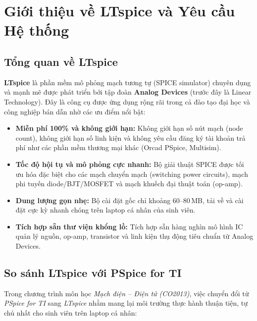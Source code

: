 \documentclass[11pt,a4paper]{article}
\begin{document}
\newpage
\tableofcontents
\newpage


\section{Giới thiệu về LTspice và Yêu cầu Hệ thống}

\subsection{Tổng quan về LTspice}
\textbf{LTspice} là phần mềm mô phỏng mạch tương tự (SPICE simulator) chuyên dụng và mạnh mẽ được phát triển bởi tập đoàn \textbf{Analog Devices} (trước đây là Linear Technology). Đây là công cụ được ứng dụng rộng rãi trong cả đào tạo đại học và công nghiệp bán dẫn nhờ các ưu điểm nổi bật:
\begin{itemize}[itemsep=2pt]
  \item \textbf{Miễn phí 100\% và không giới hạn:} Không giới hạn số nút mạch (node count), không giới hạn số linh kiện và không yêu cầu đăng ký tài khoản trả phí như các phần mềm thương mại khác (Orcad PSpice, Multisim).
  \item \textbf{Tốc độ hội tụ và mô phỏng cực nhanh:} Bộ giải thuật SPICE được tối ưu hóa đặc biệt cho các mạch chuyển mạch (switching power circuits), mạch phi tuyến diode/BJT/MOSFET và mạch khuếch đại thuật toán (op-amp).
  \item \textbf{Dung lượng gọn nhẹ:} Bộ cài đặt gốc chỉ khoảng 60--80\,MB, tải về và cài đặt cực kỳ nhanh chóng trên laptop cá nhân của sinh viên.
  \item \textbf{Tích hợp sẵn thư viện khổng lồ:} Tích hợp sẵn hàng nghìn mô hình IC quản lý nguồn, op-amp, transistor và linh kiện thụ động tiêu chuẩn từ Analog Devices.
\end{itemize}

\subsection{So sánh LTspice với PSpice for TI}
Trong chương trình môn học \textit{Mạch điện -- Điện tử (CO2013)}, việc chuyển đổi từ \textit{PSpice for TI} sang \textit{LTspice} nhằm mang lại môi trường thực hành thuận tiện, tự chủ nhất cho sinh viên trên laptop cá nhân:
\end{document}
